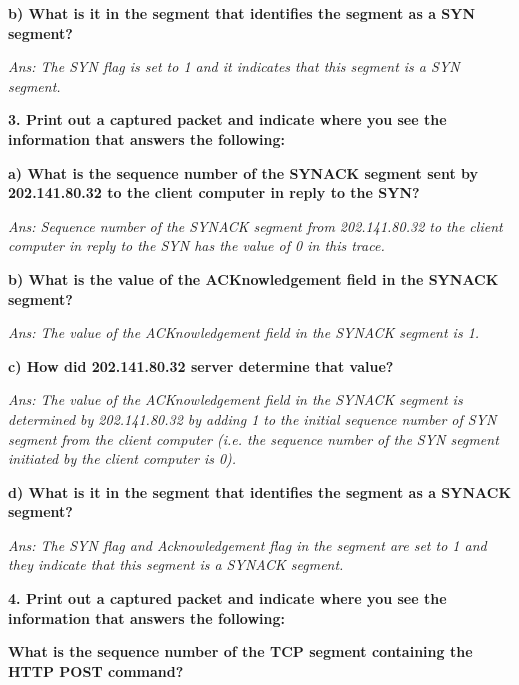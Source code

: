 \documentclass[11pt]{article}
\numberwithin{equation}{section}
\begin{document}
\textbf{b) What is it in the segment that identifies the segment as a SYN segment?} 

\textsl{Ans: The SYN flag is set to 1 and it indicates that this segment is a SYN segment. } \newline

\textbf{3. Print out a captured packet and indicate where you see the information that answers the following:} \newline



\textbf{a) What is the sequence number of the SYNACK segment sent by 202.141.80.32 to the client computer in reply to the SYN?} 

\textsl{Ans: Sequence number of the SYNACK segment from 202.141.80.32 to the client computer in reply to the SYN has the value of 0 in this trace.} \newline

\textbf{b) What is the value of the ACKnowledgement field in the SYNACK segment? }

\textsl{Ans: The value of the ACKnowledgement field in the SYNACK segment is 1.} \newline

\textbf{c) How did 202.141.80.32 server determine that value? }

\textsl{Ans: The value of the ACKnowledgement field in the SYNACK segment is determined by 202.141.80.32 by adding 1 to the initial sequence number of SYN segment from the client computer (i.e. the sequence number of the SYN segment initiated by the client computer is 0).} \newline

\textbf{ d) What is it in the segment that identifies the segment as a SYNACK segment? }

\textsl{Ans: The SYN flag and Acknowledgement flag in the segment are set to 1 and they indicate that this segment is a SYNACK segment.} \newline

\textbf{4. Print out a captured packet and indicate where you see the information that answers the following:} \newline



\textbf{ What is the sequence number of the TCP segment containing the HTTP POST command? }
\end{document}
